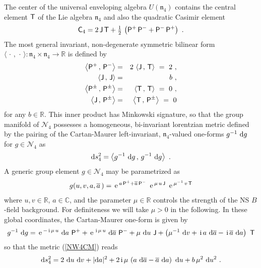 \documentclass[11pt,a4paper]{article}
\newcommand{\ii}{{\rm i}}
\newcommand{\C}{\complex}
\def\ii{{\,{\rm i}\,}}
\def\dd{{\rm d}}
\def\P{{\sf P}}
\def\T{{\sf T}}
\def\C{{\sf C}}
\def\J{{\sf J}}
\newcommand{\complex}{{\mathbb C}} %
\newcommand{\real}{{\mathbb R}} %
\def\nn{\nonumber}
\def\e{{\,\rm e}\,}
\def\bea{\begin{eqnarray}}
\def\eea{\end{eqnarray}}
\newcommand{\beq}{\begin{eqnarray}}
\newcommand{\eeq}{\end{eqnarray}}
\begin{document}
The center of the universal enveloping algebra $U(\mathfrak n_4)$
contains the central element $\T$ of the Lie algebra $\mathfrak{n}_4$
and also the quadratic Casimir element
\beq
\C_4=2\,\J\,\T+\mbox{$\frac12$}\,\left(\P^+\,\P^-+\P^-\,\P^+\right) \ .
\label{NW4Casimir}\eeq
The most general invariant, non-degenerate symmetric bilinear form
$\langle\,\cdot\,,\,\cdot\,\rangle:\mathfrak{n}_4\times\mathfrak{n}_4\to\real$
is defined by~\cite{NW1}
\bea
\left\langle\P^+\,,\,\P^-\right\rangle&=&2\,
\left\langle\J\,,\,\T\right\rangle~=~2 \ , \nn\\
\left\langle\J\,,\,\J\right\rangle&=&b \ , \nn\\
\left\langle\P^\pm\,,\,\P^\pm\right\rangle&=&
\left\langle\T\,,\,\T\right\rangle~=~0 \ , \nn\\
\left\langle\J\,,\,\P^\pm\right\rangle&=&\left\langle\T\,,\,
\P^\pm\right\rangle~=~0
\label{NW4innerprod}\eea
for any $b\in\real$. This inner product has Minkowski signature, so that the
group manifold of $\mathcal N_4$ possesses a
homogeneous, bi-invariant lorentzian metric defined by the pairing of
the Cartan-Maurer left-invariant, $\mathfrak n_4$-valued one-forms
$g^{-1}~\dd g$ for $g\in\mathcal N_4$ as
\beq
\dd s_4^2=\left\langle g^{-1}~\dd g\,,\,g^{-1}~\dd g\right\rangle \ .
\label{NW4CM}\eeq
A generic group element $g\in\mathcal N_4$ may be parametrized as
\beq
g(u,v,a,\overline{a}\,)=\e^{a\,\P^++\overline{a}\,\P^-}~
\e^{\mu\,u\,\J}~\e^{\mu^{-1}\,v\,\T}
\label{NW4coords}\eeq
where $u,v\in\real$, $a\in\complex$, and the parameter $\mu\in\real$
controls the strength of the NS $B$-field background. For definiteness
we will take $\mu>0$ in the following. In these
global coordinates, the Cartan-Maurer one-form is given by
\beq
g^{-1}~\dd g=\e^{-\ii\mu\,u}~\dd a~\P^++\e^{\ii\mu\,u}~
\dd\overline{a}~\P^-+\mu~\dd u~\J+\left(\mu^{-1}~\dd v+\ii
a~\dd\overline{a}-\ii\overline{a}~\dd a\right)~\T
\label{NW4CMform}\eeq
so that the metric (\ref{NW4CM}) reads
\beq
\dd s_4^2=2~\dd u~\dd v+|\dd a|^2+2\ii\mu\,\left(a~
\dd\overline{a}-\overline{a}~\dd a\right)~\dd u+b\,\mu^2~\dd u^2 \ .
\label{NW4metricNW}\eeq
\end{document}

